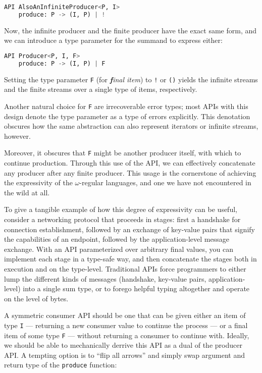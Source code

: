 \documentclass[sigplan,screen,10pt,anonymous,review]{acmart}
\begin{document}
\begin{lstlisting}[language=Python]
API AlsoAnInfiniteProducer<P, I>
    produce: P -> (I, P) | !
\end{lstlisting}

Now, the infinite producer and the finite producer have the exact same form, and we can introduce a type parameter for the summand to express either:

\begin{lstlisting}[language=Python]
API Producer<P, I, F>
    produce: P -> (I, P) | F
\end{lstlisting}

Setting the type parameter \texttt{F} (for \textit{\textbf{f}inal item}) to \texttt{!} or \texttt{()} yields the infinite streams and the finite streams over a single type of items, respectively.

Another natural choice for \texttt{F} are irrecoverable error types; most APIs with this design denote the type parameter as a type of errors explicitly. This denotation obscures how the same abstraction can also represent iterators or infinite streams, however.

Moreover, it obscures that \texttt{F} might be another producer itself, with which to continue production. Through this use of the API, we can effectively concatenate any producer after any finite producer. This usage is the cornerstone of achieving the expressivity of the $\omega$-regular languages, and one we have not encountered in the wild at all.

To give a tangible example of how this degree of expressivity can be useful, consider a networking protocol that proceeds in stages: first a handshake for connection establishment, followed by an exchange of key-value pairs that signify the capabilities of an endpoint, followed by the application-level message exchange. With an API parameterized over arbitrary final values, you can implement each stage in a type-safe way, and then concatenate the stages both in execution and on the type-level. Traditional APIs force programmers to either lump the different kinds of messages (handshake, key-value pairs, application-level) into a single sum type, or to forego helpful typing altogether and operate on the level of bytes.

A symmetric consumer API should be one that can be given either an item of type \texttt{I} --- returning a new consumer value to continue the process --- or a final item of some type \texttt{F} --- without returning a consumer to continue with. Ideally, we should be able to mechanically derrive this API as a dual of the producer API. A tempting option is to ``flip all arrows'' and simply swap argument and return type of the \texttt{produce} function:
\end{document}
